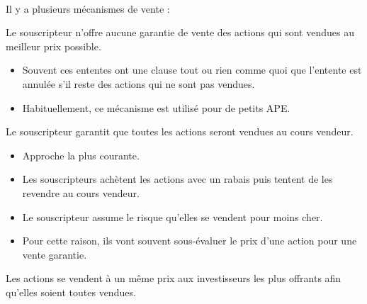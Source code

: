 \documentclass[10pt, french]{article}
\begin{document}
\begin{multicols*}{2}
\

Il y a plusieurs mécanismes de vente :

\begin{definitionNOHFILLpropos}
Le souscripteur n'offre aucune garantie de vente des actions qui sont vendues au meilleur prix possible.
\begin{itemize}
	\item	Souvent ces ententes ont une clause tout ou rien comme quoi que l'entente est annulée s'il reste des actions qui ne sont pas vendues.
	\item	Habituellement, ce mécanisme est utilisé pour de petits APE.
\end{itemize}
\end{definitionNOHFILLpropos}

\begin{definitionNOHFILLpropos}
Le souscripteur garantit que toutes les actions seront vendues au cours vendeur.
\begin{itemize}
	\item	Approche la plus courante.
	\item	Les souscripteurs achètent les actions avec un rabais puis tentent de les revendre au cours vendeur.
	\item	Le souscripteur assume le risque qu'elles se vendent pour moins cher.
	\item	Pour cette raison, ils vont souvent sous-évaluer le prix d'une action pour une vente garantie.
\end{itemize}
\end{definitionNOHFILLpropos}

\begin{definitionNOHFILLpropos}
Les actions se vendent à un même prix aux investisseurs les plus offrants afin qu’elles soient toutes vendues.
\end{definitionNOHFILLpropos}



\end{multicols*}
\end{document}

